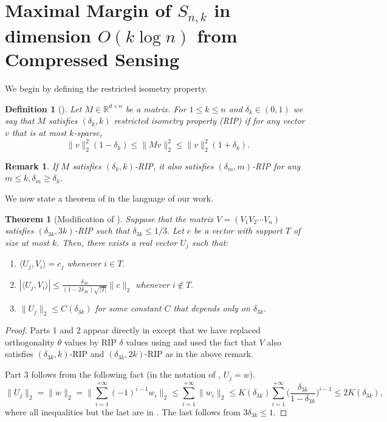 \documentclass[preprint]{article}
\newtheorem{definition}{Definition}[]
\newtheorem{theorem}{Theorem}[section]
\newtheorem{remark}{Remark}[]
\newcommand{\ksparsen}{S_{n,k}}
\begin{document}
\section{Maximal Margin 
of \texorpdfstring{$\ksparsen$}{Snk} in 
dimension 
\texorpdfstring{$O(k\log n)$}{klogn} from Compressed Sensing}
\label{sec:largemarginviasparsecoding}
We begin by defining the restricted isometry property. 

\begin{definition}[\cite{CandesTao2005}] Let $M \in \mathbb{R}^{d\times n}$ be a matrix. For $1\le k \le n$ and $\delta_k\in (0,1)$ we say that $M$ satisfies $(\delta_k,k)$ restricted isometry property (RIP) if for any vector $v$ that is at most $k$-sparse, 
$$
\|v\|_2^2(1-\delta_k)\le 
\|Mv\|_2^2\le 
\|v\|_2^2(1+\delta_k).
$$    
\end{definition}
\begin{remark}
If $M$ satisfies $(\delta_k, k)$-RIP, it also satisfies $(\delta_m, m)$-RIP for any $m \le k, \delta_m \ge \delta_k.$\end{remark}

We now state a theorem of \cite{CandesTao2005} in the language of our work.   
\begin{theorem}[Modification of \cite{CandesTao2005}]
\label{thm:candestaocertificates}
Suppose that the matrix $V = (V_1 V_2 \cdots V_n)$ satisfies
$(\delta_{3k},3k)$-RIP such that
$\delta_{3k}\le 1/3.$
Let $c$ be a vector with support $T$ of size at most $k.$ Then, there exists a real vector $U_j$ such that:
\begin{enumerate}
    \item $\langle U_j, V_i\rangle = c_j$ whenever $i \in T.$
    \item $|\langle U_j, V_i\rangle| \le \frac{\delta_{3k}}{(1-2\delta_{3k})\sqrt{|T|}}\|c\|_2$ whenever $i \not \in T.$
    \item $\|U_j\|_2\le C(\delta_{3k})$ for some constant $C$ that depends only on $\delta_{3k}.$
\end{enumerate}
\end{theorem}
\begin{proof} 
Parts 1 and 2 appear directly in \cite[Lemma 2.2]{CandesTao2005} except that we have replaced orthogonality $\theta$ values by RIP $\delta$ values using \cite[Lemma 1.2]{CandesTao2005} and used the fact that $V$ also satisfies $(\delta_{3k},k)$-RIP and $(\delta_{3k},2k)$-RIP as in the above remark. 

Part 3 follows from the following fact (in the notation of \cite{CandesTao2005}, $U_j = w$).
$$
\|U_j\|_2 = \|w\|_2 = 
\|\sum_{i = 1}^{+\infty}(-1)^{i-1}w_i\|_2 \le 
\sum_{i = 1}^{+\infty}\|w_i\|_2\le
K(\delta_{3k})\sum_{i = 1}^{+\infty} \Big(\frac{\delta_{3k}}{1-\delta_{3k}}\Big)^{i-1}\le 
2K(\delta_{3k}),
$$
where all inequalities but the last are in \cite[Lemma 2.2]{CandesTao2005}. The last follows from $3\delta_{3k}\le 1.$
\end{proof}
\end{document}
